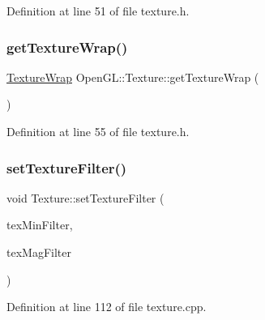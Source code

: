 Definition at line 51 of file texture.\+h.

\mbox{\label{class_open_g_l_1_1_texture_aacf92c2dd4d2e93b483c9fe1978a8aa4}} 
\subsubsection{\texorpdfstring{getTextureWrap()}{getTextureWrap()}}
{\footnotesize\ttfamily \mbox{\hyperlink{namespace_open_g_l_a22eb6a3df5ed600fb89f2baf8d1c8027}{Texture\+Wrap}} Open\+G\+L\+::\+Texture\+::get\+Texture\+Wrap (\begin{DoxyParamCaption}{ }\end{DoxyParamCaption})\hspace{0.3cm}{\ttfamily [inline]}}



Definition at line 55 of file texture.\+h.

\mbox{\label{class_open_g_l_1_1_texture_a52b73edf08a1621ad18e20afa2b3446a}} 
\subsubsection{\texorpdfstring{setTextureFilter()}{setTextureFilter()}}
{\footnotesize\ttfamily void Texture\+::set\+Texture\+Filter (\begin{DoxyParamCaption}\item[{\mbox{\hyperlink{namespace_open_g_l_a34bc5965567ca64f43e5e38e7cfdb2e4}{Texture\+Filter}}}]{tex\+Min\+Filter,  }\item[{\mbox{\hyperlink{namespace_open_g_l_a34bc5965567ca64f43e5e38e7cfdb2e4}{Texture\+Filter}}}]{tex\+Mag\+Filter }\end{DoxyParamCaption})}



Definition at line 112 of file texture.\+cpp.

\mbox{\label{class_open_g_l_1_1_texture_a8078d636e2c0a31812d90f0010dcab7a}} 
